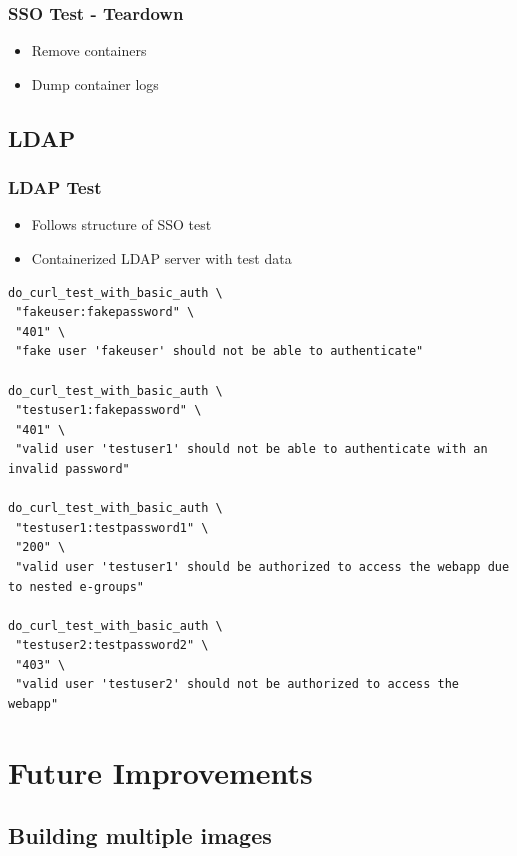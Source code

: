 \documentclass[14pt,aspectratio=169]{beamer}
\begin{document}
{\begin{frame}
  \frametitle{SSO Test - Teardown}
  \begin{itemize}
    \item Remove containers
    \item Dump container logs
  \end{itemize}
\end{frame}

\subsection{LDAP}

\begin{frame}[fragile]
  \frametitle{LDAP Test}
  \begin{itemize}
    \item Follows structure of SSO test
    \item Containerized LDAP server with test data
  \end{itemize}
  \begin{verbatim}
do_curl_test_with_basic_auth \
 "fakeuser:fakepassword" \
 "401" \
 "fake user 'fakeuser' should not be able to authenticate"

do_curl_test_with_basic_auth \
 "testuser1:fakepassword" \
 "401" \
 "valid user 'testuser1' should not be able to authenticate with an invalid password"

do_curl_test_with_basic_auth \
 "testuser1:testpassword1" \
 "200" \
 "valid user 'testuser1' should be authorized to access the webapp due to nested e-groups"

do_curl_test_with_basic_auth \
 "testuser2:testpassword2" \
 "403" \
 "valid user 'testuser2' should not be authorized to access the webapp"
  \end{verbatim}
\end{frame}

\section{Future Improvements}

\subsection{Building multiple images}

}
\end{document}
